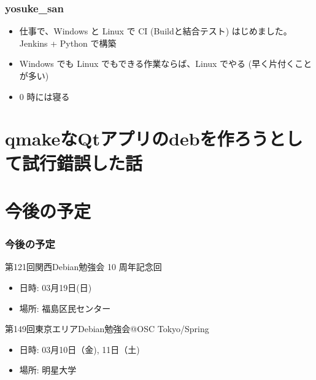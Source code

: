\documentclass[cjk,dvipdfmx,12pt,compress,%
hyperref={bookmarks=true,bookmarksnumbered=true,bookmarksopen=false,%
colorlinks=false,%
pdftitle={第 120 回 関西 Debian 勉強会},%
pdfauthor={倉敷・のがた・佐々木・かわだ・おおつき},%
pdfsubject={資料},%
}]{beamer}
\begin{document}
\begin{frame}
  \frametitle{ yosuke\_san }
  \begin{itemize}
  \item 仕事で、Windows と Linux で CI (Buildと結合テスト) はじめました。Jenkins + Python で構築
  \item Windows でも Linux でもできる作業ならば、Linux でやる (早く片付くことが多い)
  \item 0 時には寝る
  \end{itemize}
\end{frame}


\section{ qmakeなQtアプリのdebを作ろうとして試行錯誤した話}


\section{今後の予定}
\begin{frame}[fragile]
  \frametitle{今後の予定}

  \begin{block}{第121回関西Debian勉強会 10 周年記念回}
    \begin{itemize}
    \item 日時: 03月19日(日)
    \item 場所: 福島区民センター
    \end{itemize}
  \end{block}

  \begin{block}{第149回東京エリアDebian勉強会@OSC Tokyo/Spring}
    \begin{itemize}
    \item 日時: 03月10日（金), 11日（土)
    \item 場所: 明星大学
    \end{itemize}
  \end{block}

\end{frame}

\takahashi[50]{  }
\end{document}
